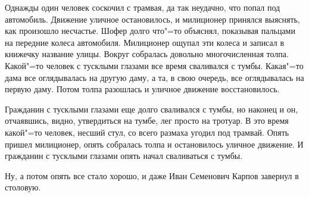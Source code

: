 Однажды один человек соскочил с трамвая, да так неудачно, что попал под автомобиль. Движение уличное остановилось, и милиционер принялся выяснять, как произошло несчастье. Шофер долго что"=то объяснял, показывая пальцами на передние колеса автомобиля. Милиционер ощупал эти колеса и записал в книжечку название улицы. Вокруг собралась довольно многочисленная толпа. Какой"=то человек с тусклыми глазами все время сваливался с тумбы. Какая"=то дама все оглядывалась на другую даму, а та, в свою очередь, все оглядывалась на первую даму. Потом толпа разошлась и уличное движение восстановилось.

Гражданин с тусклыми глазами еще долго сваливался с тумбы, но наконец и он, отчаявшись, видно, утвердиться на тумбе, лег просто на тротуар. В это время какой"=то человек, несший стул, со всего размаха угодил под трамвай. Опять пришел милиционер, опять собралась толпа и остановилось уличное движение. И гражданин с тусклыми глазами опять начал сваливаться с тумбы.

Ну, а потом опять все стало хорошо, и даже Иван Семенович Карпов завернул в столовую.
